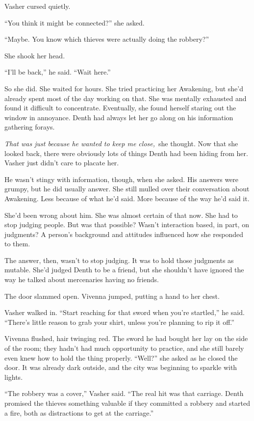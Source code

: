 Vasher cursed quietly.

“You think it might be connected?” she asked.

“Maybe. You know which thieves were actually doing the robbery?”

She shook her head.

“I’ll be back,” he said. “Wait here.”

\orn

So she did. She waited for hours. She tried practicing her Awakening, but she’d already spent most of the day working on that. She was mentally exhausted and found it difficult to concentrate. Eventually, she found herself staring out the window in annoyance. Denth had always let her go along on his information gathering forays.

\textit{That was just because he wanted to keep me close,}~she thought. Now that she looked back, there were obviously lots of things Denth had been hiding from her. Vasher just didn’t care to placate her.

He wasn’t stingy with information, though, when she asked. His answers were grumpy, but he did usually answer. She still mulled over their conversation about Awakening. Less because of what he’d said. More because of the way he’d said it.

She’d been wrong about him. She was almost certain of that now. She had to stop judging people. But was that possible? Wasn’t interaction based, in part, on judgments? A person’s background and attitudes influenced how she responded to them.

The answer, then, wasn’t to stop judging. It was to hold those judgments as mutable. She’d judged Denth to be a friend, but she shouldn’t have ignored the way he talked about mercenaries having no friends.

The door slammed open. Vivenna jumped, putting a hand to her chest.

Vasher walked in. “Start reaching for that sword when you’re startled,” he said. “There’s little reason to grab your shirt, unless you’re planning to rip it off.”

Vivenna flushed, hair twinging red. The sword he had bought her lay on the side of the room; they hadn’t had much opportunity to practice, and she still barely even knew how to hold the thing properly. “Well?” she asked as he closed the door. It was already dark outside, and the city was beginning to sparkle with lights.

“The robbery was a cover,” Vasher said. “The real hit was that carriage. Denth promised the thieves something valuable if they committed a robbery and started a fire, both as distractions to get at the carriage.”

